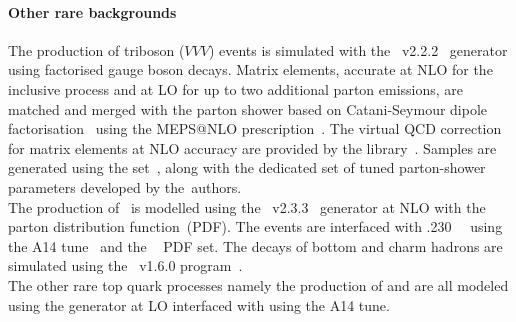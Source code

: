 \paragraph{Other rare backgrounds}
The production of triboson ($VVV$) events is simulated with the 
\sherpa~v2.2.2~\cite{Bothmann:2019yzt} generator using factorised gauge boson decays. 
Matrix elements, accurate at NLO for the inclusive process and at LO for up to 
two additional parton emissions, are matched and merged with the \sherpa parton 
shower based on Catani-Seymour dipole factorisation~\cite{Gleisberg:2008fv,Schumann:2007mg} 
using the MEPS@NLO prescription~\cite{Hoeche:2011fd,Hoeche:2012yf,Catani:2001cc,Hoeche:2009rj}. 
The virtual QCD correction for matrix elements at NLO accuracy are 
provided by the \openloops library~\cite{Buccioni:2019sur,Cascioli:2011va,Denner:2016kdg}.
Samples are generated using the \nnpdfnnlo set~\cite{Ball:2014uwa}, along with
the dedicated set of tuned parton-shower parameters developed by the~\sherpa authors.\\
The production of \tttt\ is modelled using the \mgamc~v2.3.3~\cite{Alwall:2014hca}
generator at NLO with the \nnpdfonenlo~\cite{Ball:2014uwa} parton distribution function~(PDF).
The events are interfaced with \pythia.230~\cite{Sjostrand:2014zea}~ using the A14 tune~\cite{ATL-PHYS-PUB-2014-021} and the
\nnpdftwo~\cite{Ball:2014uwa} PDF set.
The decays of bottom and charm hadrons are simulated using the \evtgen\ v1.6.0 program~\cite{Lange:2001uf}. \\
The other rare top quark processes namely the production of \ttWW and \ttt are all modeled using the \mgamc generator at LO interfaced with \pythia using the A14 tune.

